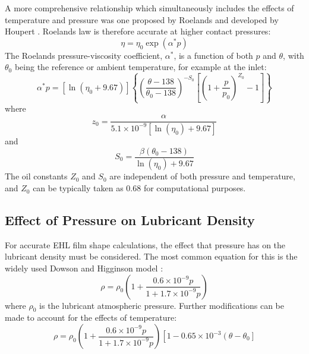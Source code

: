 A more comprehensive relationship which simultaneously includes the effects of temperature and pressure was one proposed by Roelands \cite{Roelands1966} and developed by Houpert \cite{Houpert1984}.  Roelands law is therefore accurate at higher contact pressures:
\begin{equation}\label{eq3.25}
    \eta=\eta_0 \exp \left(\alpha^* p\right)
\end{equation}
The Roelands pressure-viscosity coefficient, $\alpha^\ast$, is a function of both $p$ and $\theta$, with $\theta_0$ being the reference or ambient temperature, for example at the inlet:
\begin{equation}\label{eq3.26}
	\alpha^* p=\left[\ln \left(\eta_0+9.67\right)\right]\left\{\left(\frac{\theta-138}{\theta_0-138}\right)^{-S_0}\left[\left(1+\frac{p}{p_0}\right)^{Z_0}-1\right]\right\}
\end{equation}
where
\begin{equation}\label{eq3.27}
	z_0=\frac{\alpha}{5.1 \times 10^{-9}\left[\ln \left(\eta_0\right)+9.67\right]}
\end{equation}
and
\begin{equation}\label{eq3.28}
	S_0=\frac{\beta\left(\theta_0-138\right)}{\ln \left(\eta_0\right)+9.67}
\end{equation}
The oil constants $Z_0$ and $S_0$ are independent of both pressure and temperature, and $Z_0$ can be typically taken as 0.68 for computational purposes.

\subsection{Effect of Pressure on Lubricant Density}

For accurate EHL film shape calculations, the effect that pressure has on the lubricant density must be considered. The most common equation for this is the widely used Dowson and Higginson model \cite{Dowson1977}:
\begin{equation}\label{eq3.29}
	\rho=\rho_0\left(1+\frac{0.6 \times 10^{-9} p}{1+1.7 \times 10^{-9} p}\right)
\end{equation}
where $\rho_0$ is the lubricant atmospheric pressure. Further modifications can be made to account for the effects of temperature:
\begin{equation}\label{eq3.30}
	\rho=\rho_0\left(1+\frac{0.6 \times 10^{-9} p}{1+1.7 \times 10^{-9} p}\right)\left[1-0.65 \times 10^{-3}\left(\theta-\theta_0\right]\right.
\end{equation}

